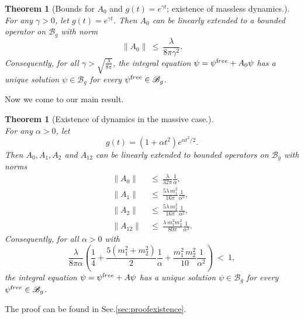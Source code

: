 \documentclass[b5paper,draft,openbib,12pt]{memoir}
\newtheorem{Thm}[Def]{Theorem}
\newcommand{\free}{{\textup free}}
\newcommand{\Banach}{\mathscr{B}}
\begin{document}
\begin{Thm}[Bounds for $A_0$ and $g(t) = e^{\gamma t}$; existence 
  of massless dynamics.]
	\label{thm:exponentialg}
~\\ For any $\gamma> 0$, let $g(t) = e^{\gamma t}$. Then $A_0$ 
can be linearly extended to a bounded operator on $\Banach_g$ 
with norm
	\begin{equation}
		\| A_0 \| ~\leq~ \frac{\lambda}{8\pi \gamma^2}.
	\label{eq:norma0exponential}
	\end{equation}
Consequently, for all $\gamma > \sqrt{\frac{\lambda}{8\pi}}$, the 
integral equation $\psi = \psi^\free + A_0\psi$ has a unique 
solution $\psi \in \Banach_g$ for every $\psi^\free \in \Banach_g$.
\end{Thm}

Now we come to our main result.

\begin{Thm}[Existence of dynamics in the massive case.]
	\label{thm:existence}~\\
	For any $\alpha > 0$, let
	\begin{equation}
		g(t) = (1+\alpha t^2)e^{\alpha t^2/2}.
	\label{eq:weightfactor}
	\end{equation}
	 Then $A_0, A_1, A_2$ and $A_{12}$ can be linearly extended to bounded operators on $\Banach_g$ with norms
	\begin{align}
		\| A_0 \| ~&\leq~ \frac{\lambda}{32 \pi} \frac{1}{\alpha}, \label{eq:estimatea0final}\\
		\| A_1 \| ~&\leq~ \frac{5\lambda \, m_1^2}{16\pi} \frac{1}{\alpha^2},\label{eq:estimatea1final}\\
		\| A_2 \| ~&\leq~ \frac{5\lambda \, m_2^2}{16\pi} \frac{1}{\alpha^2}, \label{eq:estimatea2final}\\
		\| A_{12} \| ~&\leq~ \frac{\lambda \, m_1^2 m_2^2}{80\pi} \frac{1}{\alpha^3}. \label{eq:estimatea12final}
	\end{align}
	Consequently, for all $\alpha > 0$ with
\begin{equation}
	\frac{\lambda}{8\pi \alpha} \left( \frac{1}{4} + \frac{5(m_1^2 + m_2^2)}{2} \frac{1}{\alpha} + \frac{m_1^2 \, m_2^2}{10} \frac{1}{\alpha^2} \right) ~<~ 1,
\label{eq:condexistencemassive}
\end{equation}
	the integral equation $\psi = \psi^\free + A\psi$ has a unique solution $\psi \in \Banach_g$ for every $\psi^\free \in \Banach_g$.
\end{Thm}

The proof can be found in Sec.\@ \ref{sec:proofexistence}.
\end{document}
